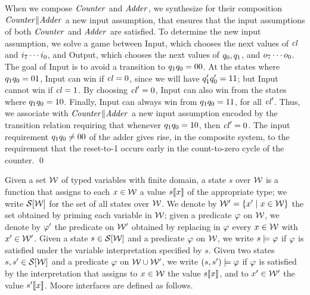 \begin{examp}{}
When we compose ${\text{\textit{Counter}}}$ and ${\text{\textit{Adder}}}$, we
synthesize for their composition ${\text{\textit{Counter}}} \| {\text{\textit{Adder}}}$ a new input
assumption, that ensures that the input assumptions of both ${\text{\textit{Counter}}}$
and ${\text{\textit{Adder}}}$ are satisfied. 
To determine the new input assumption, we solve a game between Input,
which chooses the next values of ${\text{\textit{cl}}}$ and $i_7\cdots i_0$, and
Output, which chooses the next values of 
$q_0,q_1$, and $o_7 \cdots o_0$.
The goal of Input is to avoid a transition to $q_1 q_0 = 00$.
At the states where $q_1 q_0 = 01$, Input can win if 
${\text{\textit{cl}}} = 0$, since 
we will have $q'_1 q'_0 = 11$;  
but Input cannot win if ${\text{\textit{cl}}} = 1$. 
By choosing ${\text{\textit{cl}}}' = 0$, Input can also win from 
the states where $q_1 q_0 = 10$. 
Finally, Input can always win from 
$q_1 q_0 = 11$, for all ${\text{\textit{cl}}}'$. 
Thus, we associate with ${\text{\textit{Counter}}} \| {\text{\textit{Adder}}}$ a new
input assumption encoded by the transition relation 
requiring that whenever $q_1 q_0 = 10$, then ${\text{\textit{cl}}}' = 0$.
The input requirement $q_1 q_0 \neq 00$ of the adder gives
rise, in the composite system, to the requirement that the reset-to-1
occurs early in the count-to-zero cycle of the counter.
\qed
\end{examp}

\noindent
Given a set ${\cal W}$ of typed variables with finite domain, a state
$s$ over  ${\cal W}$ is a function that 
assigns to each $x \in {\cal W}$ a value $s [\![ x ]\!]$ of the
appropriate type;
we write ${\cal S}[{\cal W}]$ for the set of all states over
${\cal W}$.
We denote by ${\cal W}' = \{ x' \mid x \in {\cal W} \}$ the set
obtained by priming each variable in ${\cal W}$; 
given a predicate $\varphi$ on ${\cal W}$, we denote by
$\varphi'$ the predicate on ${\cal W}'$ obtained by replacing in
$\varphi$ every $x \in {\cal W}$ with $x' \in {\cal W}'$. 
Given a state $s \in {\cal S}[{\cal W}]$ and a predicate
$\varphi$ on ${\cal W}$, we write $s \models \varphi$ if
$\varphi$ is satisfied under the variable interpretation specified
by $s$.  
Given two states $s, s' \in {\cal S}[{\cal W}]$ and a predicate 
$\varphi$ on ${\cal W} \cup {\cal W}'$, we write 
$(s,s') \models \varphi$ if $\varphi$ is satisfied by the
interpretation that assigns to $x \in {\cal W}$ the value 
$s [\![ x ]\!]$,  and to $x' \in {\cal W}'$ the value $s' [\![ x ]\!]$.
Moore interfaces are defined as follows. 


